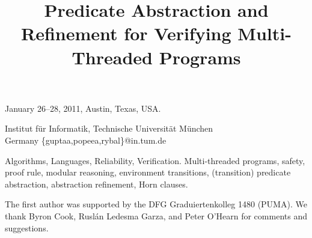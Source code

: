 \documentclass{sigplanconf}
\begin{document}
 {January 26--28, 2011, Austin, Texas, USA.}

\titlebanner{}        %
\preprintfooter{}   %

\title{Predicate Abstraction and Refinement for Verifying Multi-Threaded Programs}



           {Institut f\"ur Informatik, Technische Universit\"at M\"unchen\\Germany}
           {\{guptaa,popeea,rybal\}@in.tum.de}

\maketitle

\begin{abstract}
  
\end{abstract}

\terms
Algorithms, Languages, Reliability, Verification.
\keywords
Multi-threaded programs, safety, proof rule,
modular reasoning, environment transitions, (transition) predicate
abstraction, abstraction refinement, Horn clauses.










%

\vspace{-0.3cm}
\acks

The first author was supported by the DFG Graduiertenkolleg 1480 (PUMA).
We thank Byron Cook, Rusl\'an Ledesma Garza, and Peter O'Hearn for
comments and suggestions.








\iffalse
\appendix
% 
% 
% 
% 

\clearpage






\fi
%
\end{document}
